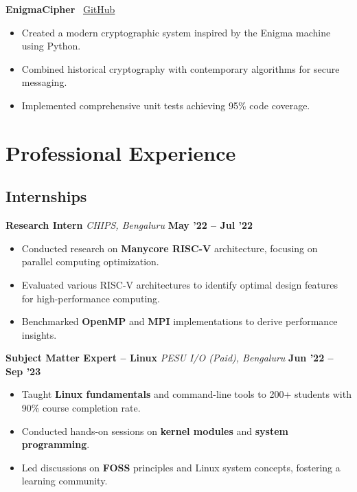 \documentclass[a4paper,10pt]{article}
\begin{document}
\textbf{EnigmaCipher} \hfill \faGithub~\href{https://github.com/AdarshLiju/enigmacipher}{GitHub}
\begin{itemize}
    \item Created a modern cryptographic system inspired by the Enigma machine using Python.
    \item Combined historical cryptography with contemporary algorithms for secure messaging.
    \item Implemented comprehensive unit tests achieving 95\% code coverage.
\end{itemize}

\section*{Professional Experience}

\subsection*{Internships}

\textbf{Research Intern} \hfill
\textit{CHIPS, Bengaluru} \hfill \textbf{May '22 -- Jul '22}
\begin{itemize}
    \item Conducted research on \textbf{Manycore RISC-V} architecture, focusing on parallel computing optimization.
    \item Evaluated various RISC-V architectures to identify optimal design features for high-performance computing.
    \item Benchmarked \textbf{OpenMP} and \textbf{MPI} implementations to derive performance insights.
\end{itemize}

\vspace{0.5em}

\textbf{Subject Matter Expert -- Linux} \hfill
\textit{PESU I/O (Paid), Bengaluru} \hfill \textbf{Jun '22 -- Sep '23}
\begin{itemize}
    \item Taught \textbf{Linux fundamentals} and command-line tools to 200+ students with 90\% course completion rate.
    \item Conducted hands-on sessions on \textbf{kernel modules} and \textbf{system programming}.
    \item Led discussions on \textbf{FOSS} principles and Linux system concepts, fostering a learning community.
\end{itemize}
\end{document}
